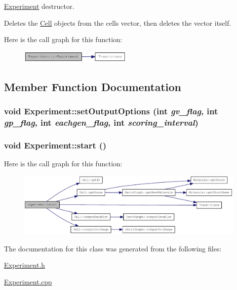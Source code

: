 \hyperlink{classExperiment}{Experiment} destructor.

Deletes the \hyperlink{classCell}{Cell} objects from the cells vector, then deletes the vector itself. 

Here is the call graph for this function:\nopagebreak
\begin{figure}[H]
\begin{center}
\leavevmode
\includegraphics[width=156pt]{classExperiment_a96058d848040e45948bbb60623711da6_cgraph}
\end{center}
\end{figure}


\subsection{Member Function Documentation}
\hypertarget{classExperiment_a7597c63f9fe2f8dede62dbe79202bf61}{
\subsubsection[{setOutputOptions}]{\setlength{\rightskip}{0pt plus 5cm}void Experiment::setOutputOptions (int {\em gv\_\-flag}, \/  int {\em gp\_\-flag}, \/  int {\em eachgen\_\-flag}, \/  int {\em scoring\_\-interval})}}
\label{classExperiment_a7597c63f9fe2f8dede62dbe79202bf61}
\hypertarget{classExperiment_ab15fca04be9b7bcad65b264b23b4a499}{
\subsubsection[{start}]{\setlength{\rightskip}{0pt plus 5cm}void Experiment::start ()}}
\label{classExperiment_ab15fca04be9b7bcad65b264b23b4a499}


Here is the call graph for this function:\nopagebreak
\begin{figure}[H]
\begin{center}
\leavevmode
\includegraphics[width=351pt]{classExperiment_ab15fca04be9b7bcad65b264b23b4a499_cgraph}
\end{center}
\end{figure}


The documentation for this class was generated from the following files:\begin{DoxyCompactItemize}
\item 
\hyperlink{Experiment_8h}{Experiment.h}\item 
\hyperlink{Experiment_8cpp}{Experiment.cpp}\end{DoxyCompactItemize}
